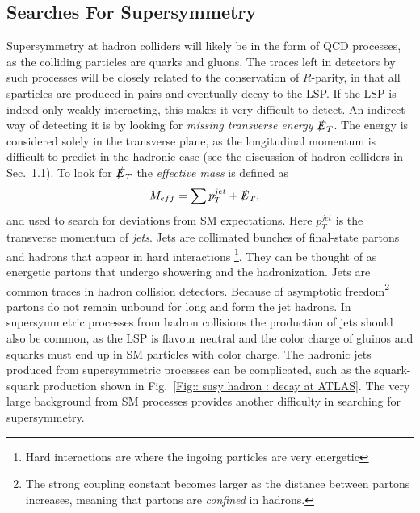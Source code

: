 \documentclass[twoside,english]{uiofysmaster}
\begin{document}
\subsection{Searches For Supersymmetry}

Supersymmetry at hadron colliders will likely be in the form of QCD processes, as the colliding particles are quarks and gluons. The traces left in detectors by such processes will be closely related to the conservation of $R$-parity, in that all sparticles are produced in pairs and eventually decay to the LSP. If the LSP is indeed only weakly interacting, this makes it very difficult to detect. An indirect way of detecting it is by looking for \textit{missing transverse energy} $\slashed{E}_T$. The energy is considered solely in the transverse plane, as the longitudinal momentum is difficult to predict in the hadronic case (see the discussion of hadron colliders in Sec.\ 1.1). To look for $\slashed{E}_T$ the \textit{effective mass} is defined as
\begin{align}
M_{eff} &= \sum p_T^{jet} + \slashed{E}_T,
\end{align} 
and used to search for deviations from SM expectations. Here $p_T^{jet}$ is the transverse momentum of \textit{jets}. Jets are collimated bunches of final-state partons and hadrons that appear in hard interactions \footnote{Hard interactions are where the ingoing particles are very energetic}. They can be thought of as energetic partons that undergo showering and the hadronization. Jets are common traces in hadron collision detectors. Because of asymptotic freedom\footnote{The strong coupling constant becomes larger as the distance between partons increases, meaning that partons are \textit{confined} in hadrons.} partons do not remain unbound for long and form the jet hadrons. In supersymmetric processes from hadron collisions the production of jets should also be common, as the LSP is flavour neutral and the color charge of gluinos and squarks must end up in SM particles with color charge. The hadronic jets produced from supersymmetric processes can be complicated, such as the squark-squark production shown in Fig.~\ref{Fig:: susy hadron : decay at ATLAS}. The very large background from SM processes provides another difficulty in searching for supersymmetry. 
\end{document}
